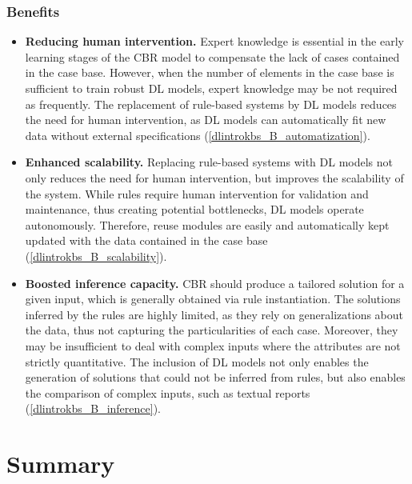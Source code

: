 \subsubsection*{Benefits}
\begin{itemize}
    \item \textbf{Reducing human intervention.} Expert knowledge is essential in the early learning stages of the CBR model to compensate the lack of cases contained in the case base. However, when the number of elements in the case base is sufficient to train robust DL models, expert knowledge may be not required as frequently. The replacement of rule-based systems by DL models reduces the need for human intervention, as DL models can automatically fit new data without external specifications (\ref{dlintrokbs_B_automatization}).
    
    \item \textbf{Enhanced scalability.} Replacing rule-based systems with DL models not only reduces the need for human intervention, but improves the scalability of the system. While rules require human intervention for validation and maintenance, thus creating potential bottlenecks, DL models operate autonomously. Therefore, reuse modules are easily and automatically kept updated with the data contained in the case base (\ref{dlintrokbs_B_scalability}).
    
    \item \textbf{Boosted inference capacity.} CBR should produce a tailored solution for a given input, which is generally obtained via rule instantiation. The solutions inferred by the rules are highly limited, as they rely on generalizations about the data, thus not capturing the particularities of each case. Moreover, they may be insufficient to deal with complex inputs where the attributes are not strictly quantitative. The inclusion of DL models not only enables the generation of solutions that could not be inferred from rules, but also enables the comparison of complex inputs, such as textual reports (\ref{dlintrokbs_B_inference}).
\end{itemize}

\section{Summary}\label{5_sec:summary}
